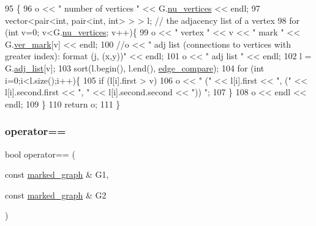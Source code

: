 \begin{DoxyCode}
95 \{
96   o << \textcolor{stringliteral}{" number of vertices "} << G.\hyperlink{classmarked__graph_acf79c6aeb8f32614cb14a5baaa6c9f9b}{nu\_vertices} << endl;
97   vector<pair<int, pair<int, int> > > l; \textcolor{comment}{// the adjacency list of a vertex}
98   \textcolor{keywordflow}{for} (\textcolor{keywordtype}{int} v=0; v<G.\hyperlink{classmarked__graph_acf79c6aeb8f32614cb14a5baaa6c9f9b}{nu\_vertices}; v++)\{
99     o << \textcolor{stringliteral}{" vertex "} << v << \textcolor{stringliteral}{" mark "} << G.\hyperlink{classmarked__graph_ac83e9377dd4d8bb95be1ac949b127296}{ver\_mark}[v] << endl;
100     \textcolor{comment}{//o << " adj list (connections to vertices with greater index): format (j, (x,y))" << endl;}
101     o << \textcolor{stringliteral}{" adj list "} << endl;
102     l = G.\hyperlink{classmarked__graph_a1a0bf7ca413a278763f7c878b3b6fd6f}{adj\_list}[v];
103     sort(l.begin(), l.end(), \hyperlink{marked__graph_8cpp_a09dd24caed50b1d106e10538e688b6ac}{edge\_compare});
104     \textcolor{keywordflow}{for} (\textcolor{keywordtype}{int} i=0;i<l.size();i++)\{
105       \textcolor{keywordflow}{if} (l[i].first > v)
106         o << \textcolor{stringliteral}{" ("} << l[i].first << \textcolor{stringliteral}{", ("} << l[i].second.first << \textcolor{stringliteral}{", "} << l[i].second.second << \textcolor{stringliteral}{")) "};
107     \}
108     o << endl << endl;
109   \}
110   \textcolor{keywordflow}{return} o;
111 \}
\end{DoxyCode}
\mbox{\label{classmarked__graph_a1718b82e881f8c37552018df1f83f82c}} 
\subsubsection{\texorpdfstring{operator==}{operator==}}
{\footnotesize\ttfamily bool operator== (\begin{DoxyParamCaption}\item[{const \hyperlink{classmarked__graph}{marked\+\_\+graph} \&}]{G1,  }\item[{const \hyperlink{classmarked__graph}{marked\+\_\+graph} \&}]{G2 }\end{DoxyParamCaption})\hspace{0.3cm}{\ttfamily [friend]}}



